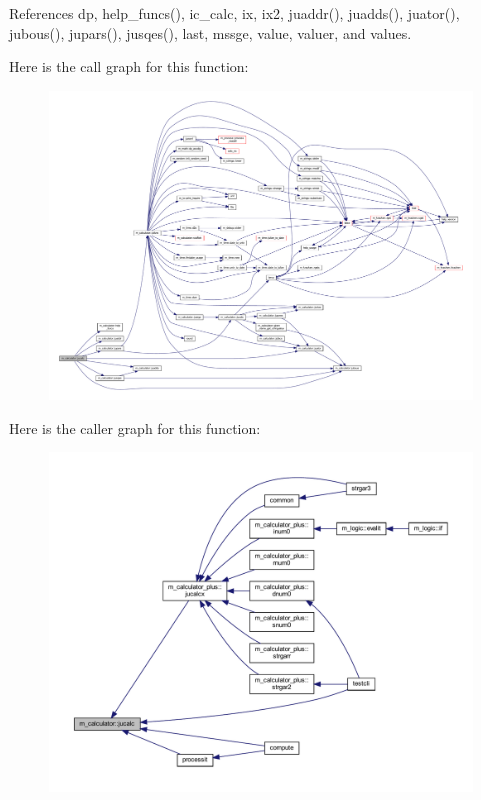 References dp, help\+\_\+funcs(), ic\+\_\+calc, ix, ix2, juaddr(), juadds(), juator(), jubous(), jupars(), jusqes(), last, mssge, value, valuer, and values.

Here is the call graph for this function\+:
\nopagebreak
\begin{figure}[H]
\begin{center}
\leavevmode
\includegraphics[width=350pt]{namespacem__calculator_a2a06dd612d1c0e059f6fb2a267325201_cgraph}
\end{center}
\end{figure}
Here is the caller graph for this function\+:
\nopagebreak
\begin{figure}[H]
\begin{center}
\leavevmode
\includegraphics[width=350pt]{namespacem__calculator_a2a06dd612d1c0e059f6fb2a267325201_icgraph}
\end{center}
\end{figure}
\mbox{\label{namespacem__calculator_a1461bad85da11d09210daefe3f80973d}} 
